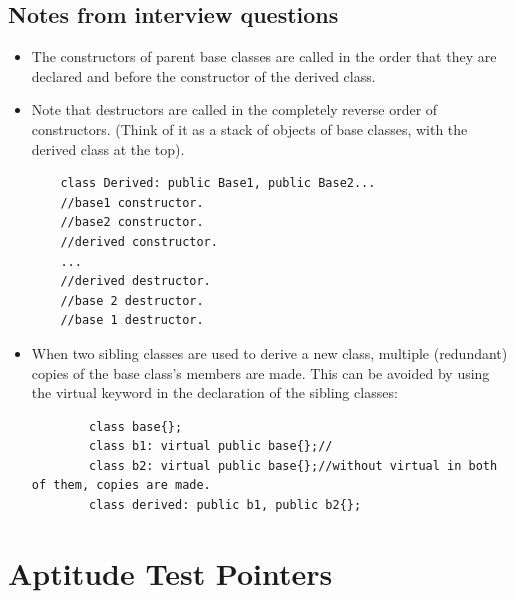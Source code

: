 \documentclass{report}
\begin{document}
\section{Notes from interview questions}
\begin{itemize}
    \item The constructors of parent base classes are called in the order that they are declared and before the constructor of the derived class.
    \item Note that destructors are called in the completely reverse order of constructors. (Think of it as a stack of objects of base classes, with the derived class at the top).
\begin{lstlisting}
    class Derived: public Base1, public Base2...
    //base1 constructor.
    //base2 constructor.
    //derived constructor.
    ...
    //derived destructor.
    //base 2 destructor.
    //base 1 destructor.
\end{lstlisting}
    \item When two sibling classes are used to derive a new class, multiple (redundant) copies
    of the base class's members are made. This can be avoided by using the virtual keyword in
    the declaration of the sibling classes:
    \begin{lstlisting}
        class base{};
        class b1: virtual public base{};//
        class b2: virtual public base{};//without virtual in both of them, copies are made.
        class derived: public b1, public b2{};
    \end{lstlisting}
\end{itemize}
\chapter{Aptitude Test Pointers}

\end{document}
